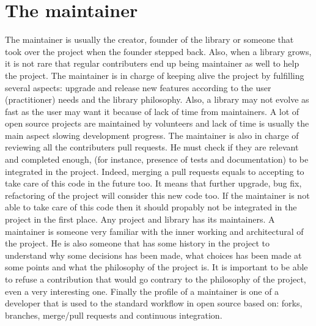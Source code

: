 \section{The maintainer}

The maintainer is usually the creator, founder of the library or someone that took over the project when the founder
stepped back. Also, when a library grows, it is not rare that regular contributers end up being maintainer as well to
help the project. The maintainer is in charge of keeping alive the project by fulfilling several aspects: upgrade and
release new features according to the user (practitioner) needs and the library philosophy. Also, a library may not
evolve as fast as the user may want it because of lack of time from maintainers. A lot of open source projects are
maintained by volunteers and lack of time is usually the main aspect slowing development progress. The maintainer is
also in charge of reviewing all the contributers pull requests. He must check if they are relevant and completed enough,
(for instance, presence of tests and documentation) to be integrated in the project. Indeed, merging a pull requests
equals to accepting to take care of this code in the future too. It means that further upgrade, bug fix, refactoring of
the project will consider this new code too. If the maintainer is not able to take care of this code then it should
propably not be integrated in the project in the first place. Any project and library has its maintainers. A maintainer
is someone very familiar with the inner working and architectural of the project. He is also someone that has some
history in the project to understand why some decisions has been made, what choices has been made at some points and
what the philosophy of the project is. It is important to be able to refuse a contribution that would go contrary to the
philosophy of the project, even a very interesting one. Finally the profile of a maintainer is one of a developer that
is used to the standard workflow in open source based on: forks, branches, merge/pull requests and continuous
integration.